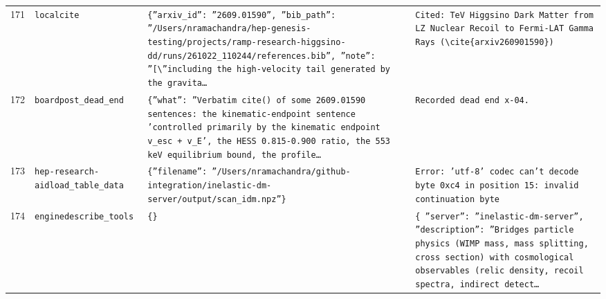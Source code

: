 \documentclass[11pt,a4paper]{article}
\begin{document}
\begin{longtable}{@{}p{}p{}p{}p{}@{}}
171 & \texttt{local}\newline\texttt{cite} & \texttt{\{''arxiv\_\allowbreak{}id'':\allowbreak{} ''2609.01590'',\allowbreak{} ''bib\_\allowbreak{}path'':\allowbreak{} ''/\allowbreak{}Users/\allowbreak{}nramachandra/\allowbreak{}hep-genesis-testing/\allowbreak{}projects/\allowbreak{}ramp-research-higgsino-dd/\allowbreak{}runs/\allowbreak{}261022\_\allowbreak{}110244/\allowbreak{}references.bib'',\allowbreak{} ''note'':\allowbreak{} ''[\textbackslash{}\allowbreak{}''including the high-velocity tail generated by the gravita\ldots{}\allowbreak{}} & \texttt{Cited:\allowbreak{} TeV Higgsino Dark Matter from LZ Nuclear Recoil to Fermi-LAT Gamma Rays (\textbackslash{}\allowbreak{}cite\{arxiv260901590\}\allowbreak{})\allowbreak{}} \\
172 & \texttt{board}\newline\texttt{post\_\allowbreak{}dead\_\allowbreak{}end} & \texttt{\{''what'':\allowbreak{} ''Verbatim cite()\allowbreak{} of some 2609.01590 sentences:\allowbreak{} the kinematic-endpoint sentence 'controlled primarily by the kinematic endpoint v\_\allowbreak{}esc + v\_\allowbreak{}E',\allowbreak{} the HESS 0.815-0.900 ratio,\allowbreak{} the 553 keV equilibrium bound,\allowbreak{} the profile\ldots{}\allowbreak{}} & \texttt{Recorded dead end x-04.} \\
173 & \texttt{hep-research-aid}\newline\texttt{load\_\allowbreak{}table\_\allowbreak{}data} & \texttt{\{''filename'':\allowbreak{} ''/\allowbreak{}Users/\allowbreak{}nramachandra/\allowbreak{}github-integration/\allowbreak{}inelastic-dm-server/\allowbreak{}output/\allowbreak{}scan\_\allowbreak{}idm.npz''\}\allowbreak{}} & \texttt{Error:\allowbreak{} 'utf-8' codec can't decode byte 0xc4 in position 15:\allowbreak{} invalid continuation byte} \\
174 & \texttt{engine}\newline\texttt{describe\_\allowbreak{}tools} & \texttt{\{\}\allowbreak{}} & \texttt{\{   ''server'':\allowbreak{} ''inelastic-dm-server'',\allowbreak{}   ''description'':\allowbreak{} ''Bridges particle physics (WIMP mass,\allowbreak{} mass splitting,\allowbreak{} cross section)\allowbreak{} with cosmological observables (relic density,\allowbreak{} recoil spectra,\allowbreak{} indirect detect\ldots{}\allowbreak{}} \\

\end{longtable}
\end{document}
